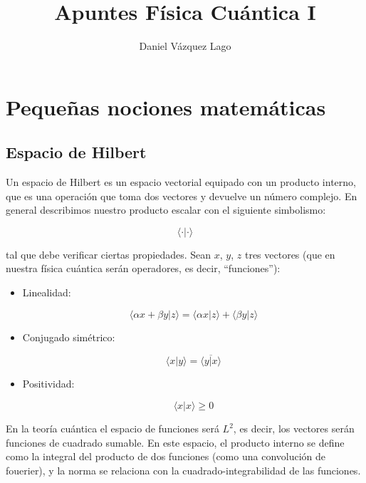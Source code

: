 \documentclass[12pt,a4paper]{article}
\author{Daniel Vázquez Lago}
\title{Apuntes Física Cuántica I}
\numberwithin{equation}{section}
\numberwithin{figure}{section}
\begin{document}
\maketitle

\newpage

\tableofcontents

\newpage

\section{Pequeñas nociones matemáticas}

\subsection{Espacio de Hilbert}

Un espacio de Hilbert es un espacio vectorial equipado con un producto interno, que es una operación que toma dos vectores y devuelve un número complejo. En general describimos nuestro producto escalar con el siguiente simbolismo:

\begin{equation}
\langle \cdot | \cdot \rangle
\end{equation}

tal que debe verificar ciertas propiedades. Sean $x$, $y$, $z$ tres vectores (que en nuestra física cuántica serán operadores, es decir, ``funciones''):

\begin{itemize}
\item Linealidad:

\begin{equation}
\langle \alpha x + \beta y | z \rangle = 
\langle \alpha x | z \rangle + 
\langle \beta y | z \rangle
\end{equation}

\item Conjugado simétrico:

\begin{equation}
\langle x | y \rangle =  \overline{\langle y | x \rangle}
\end{equation}

\item Positividad:

\begin{equation}
\langle x | x \rangle \geq 0
\end{equation}
\end{itemize}

En la teoría cuántica el espacio de funciones será $L^2$, es decir, los vectores serán funciones de cuadrado sumable. En este espacio, el producto interno se define como la integral del producto de dos funciones (como una convolución de fouerier), y la norma se relaciona con la cuadrado-integrabilidad de las funciones.
\end{document}

